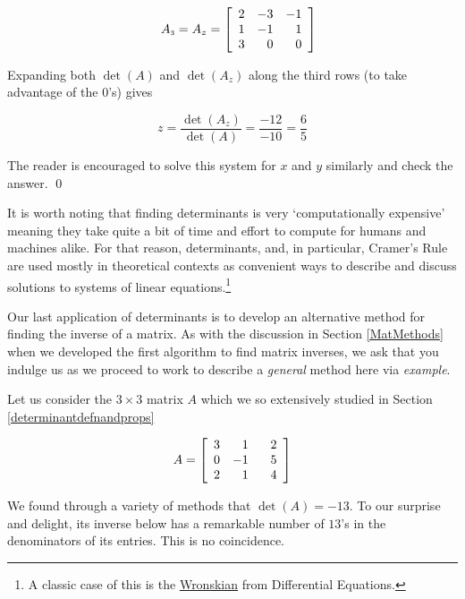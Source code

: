 \documentclass{ximera}
\begin{document}
\begin{example}
\begin{enumerate}
\[\begin{array}{cccc}
&

A_{\mbox{\tiny$3$}} = A_{z} =  \left[ \begin{array}{rrr} 2 & -3 & -1 \\ 1 & -1 & 1 \\ 3 & 0 & 0 \end{array} \right] \\

\end{array} \]

Expanding both $\det(A)$ and $\det\left(A_{z}\right)$ along the third rows (to take advantage of the $0$'s) gives

\[ z = \dfrac{\det\left(A_{z}\right)}{\det(A)} = \dfrac{-12}{-10} = \dfrac{6}{5} \]

The reader is encouraged to solve this system for $x$ and $y$ similarly and check the answer.  \qed

\end{enumerate}

\end{example}

It is worth noting that finding determinants is very `computationally expensive' meaning they take quite a bit of time and effort to compute for humans and machines alike.  For that reason, determinants, and, in particular, Cramer's Rule are used mostly in theoretical contexts as convenient ways to describe and discuss solutions to systems of linear equations.\footnote{A classic case of this is the \href{https://en.wikipedia.org/wiki/Wronskian}{\underline{Wronskian}} from Differential Equations.}

\smallskip

Our last application of determinants is to develop an alternative method for finding the inverse of a matrix. As with the discussion in Section \ref{MatMethods} when we developed the first algorithm to find matrix inverses, we ask that you indulge us as we proceed to work to describe a \textit{general} method here via \textit{example}. 

Let us consider the $3 \times 3$ matrix $A$ which we so extensively studied in Section \ref{determinantdefnandprops}

\[A = \left[ \begin{array}{rrr} 3 & 1 & \hphantom{-}2 \\ 0 & -1 & 5 \\ 2 & 1 & 4 \\ \end{array} \right]\]

We found through a variety of methods that $\det(A) = -13$.  To our surprise and delight, its inverse below has a remarkable number of $13$'s in the denominators of its entries. This is no coincidence.
\end{document}
